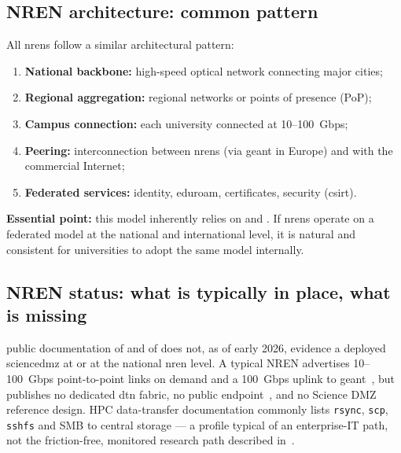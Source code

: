 \subsection{NREN architecture: common pattern}

All \gls{nren}s follow a similar architectural pattern:

\begin{enumerate}[nosep]
    \item \textbf{National backbone:} high-speed optical network
    connecting major cities;
    \item \textbf{Regional aggregation:} regional networks or points of
    presence (PoP);
    \item \textbf{Campus connection:} each university connected at
    10--100~Gbps;
    \item \textbf{Peering:} interconnection between \gls{nren}s (via \gls{geant} in
    Europe) and with the commercial Internet;
    \item \textbf{Federated services:} identity, \gls{eduroam}, certificates,
    security (\gls{csirt}).
\end{enumerate}

\textbf{Essential point:} this model inherently relies on
 and . If \gls{nren}s
operate on a federated model at the national and international level,
it is natural and consistent for universities to adopt the same model
internally.

\subsection{NREN status: what is typically in place, what is missing}
\label{subsec:lux-sdmz-status}

 public documentation of  and
of  does not, as of early 2026, evidence
a deployed \gls{sciencedmz} at  or at the national
\gls{nren} level. A typical NREN advertises 10--100~Gbps
point-to-point links on demand and a 100~Gbps uplink to
\gls{geant}~\cite{geant}, but publishes no dedicated \gls{dtn} fabric,
no public  endpoint~\cite{perfsonar}, and no
Science DMZ reference design. HPC data-transfer documentation commonly
lists \texttt{rsync}, \texttt{scp}, \texttt{sshfs} and SMB to central
storage --- a profile typical of an enterprise-IT path, not the
friction-free, monitored research path described
in~\cite{dart2013, esnet-cases}.

